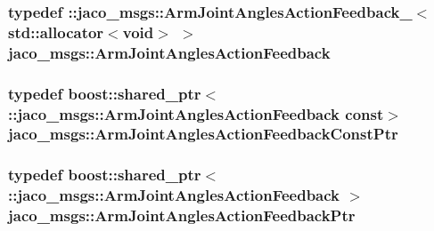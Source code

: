 \subsubsection[{\texorpdfstring{Arm\+Joint\+Angles\+Action\+Feedback}{ArmJointAnglesActionFeedback}}]{\setlength{\rightskip}{0pt plus 5cm}typedef \+::{\bf jaco\+\_\+msgs\+::\+Arm\+Joint\+Angles\+Action\+Feedback\+\_\+}$<$std\+::allocator$<$void$>$ $>$ {\bf jaco\+\_\+msgs\+::\+Arm\+Joint\+Angles\+Action\+Feedback}}\hypertarget{namespacejaco__msgs_a68c064fac934e7282ecc3b9e238706fb}{}\label{namespacejaco__msgs_a68c064fac934e7282ecc3b9e238706fb}
\subsubsection[{\texorpdfstring{Arm\+Joint\+Angles\+Action\+Feedback\+Const\+Ptr}{ArmJointAnglesActionFeedbackConstPtr}}]{\setlength{\rightskip}{0pt plus 5cm}typedef boost\+::shared\+\_\+ptr$<$ \+::{\bf jaco\+\_\+msgs\+::\+Arm\+Joint\+Angles\+Action\+Feedback} const$>$ {\bf jaco\+\_\+msgs\+::\+Arm\+Joint\+Angles\+Action\+Feedback\+Const\+Ptr}}\hypertarget{namespacejaco__msgs_ac322e8c0636bb54757f6caed5acfea74}{}\label{namespacejaco__msgs_ac322e8c0636bb54757f6caed5acfea74}
\subsubsection[{\texorpdfstring{Arm\+Joint\+Angles\+Action\+Feedback\+Ptr}{ArmJointAnglesActionFeedbackPtr}}]{\setlength{\rightskip}{0pt plus 5cm}typedef boost\+::shared\+\_\+ptr$<$ \+::{\bf jaco\+\_\+msgs\+::\+Arm\+Joint\+Angles\+Action\+Feedback} $>$ {\bf jaco\+\_\+msgs\+::\+Arm\+Joint\+Angles\+Action\+Feedback\+Ptr}}\hypertarget{namespacejaco__msgs_a71872d8ba4a458ac1d726aaf1590fcb7}{}\label{namespacejaco__msgs_a71872d8ba4a458ac1d726aaf1590fcb7}

